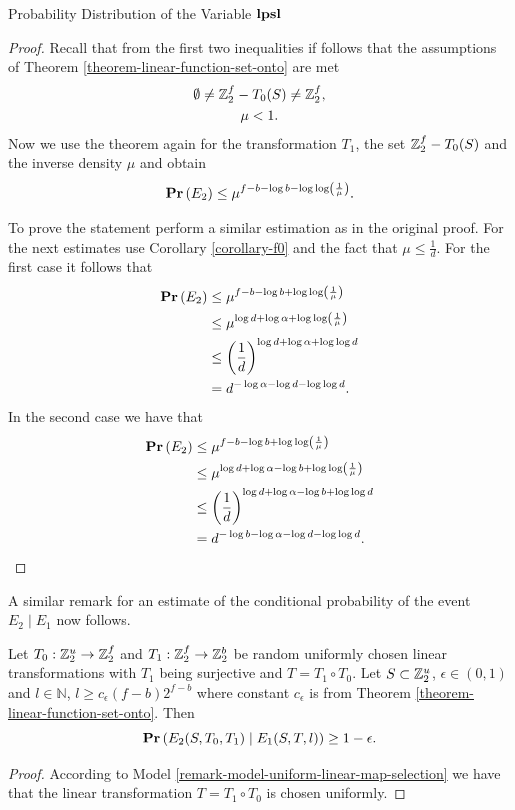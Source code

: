 \begin{section}{Probability Distribution of the Variable \texorpdfstring{$\mathbf{lpsl}$}{lpsl}}
\begin{proof}
Recall that from the first two inequalities if follows that the assumptions of Theorem \ref{theorem-linear-function-set-onto} are met
\begin{gather*}
\emptyset \neq \mathbb{Z}_{2}^{f} - T_0(S) \neq \mathbb{Z}_{2}^{f} \text{,} \\
\mu < 1 \text{.}
\end{gather*}
Now we use the theorem again for the transformation $T_1$, the set $\mathbb{Z}_{2}^{f} - T_0(S)$ and the inverse density $\mu$ and obtain
\[
	\mathbf{Pr}\left(E_2\right) \leq \mu ^ {f - b - \log b - \log \log \left( \frac{1}{\mu} \right)} \text{.}
\]

To prove the statement perform a similar estimation as in the original proof. For the next estimates use Corollary \ref{corollary-f0} and the fact that $\mu \leq \frac{1}{d}$. For the first case it follows that
\[
\begin{split}
\mathbf{Pr}\left(E_2\right) 
	& \leq \mu ^ {f - b - \log b + \log \log \left( \frac{1}{\mu} \right)} \\
	& \leq \mu ^ {\log d + \log \alpha + \log \log \left( \frac{1}{\mu} \right)} \\
	& \leq \left(\frac{1}{d}\right) ^ {\log d + \log \alpha + \log \log d} \\
	& = d ^ {-\log \alpha - \log d - \log \log d} \text{.}
\end{split}
\]
In the second case we have that 
\[
\begin{split}
\mathbf{Pr}\left(E_2\right) 
	& \leq \mu ^ {f - b - \log b + \log \log \left( \frac{1}{\mu} \right)} \\
	& \leq \mu ^ {\log d + \log \alpha - \log b  + \log \log \left( \frac{1}{\mu} \right)} \\
	& \leq \left(\frac{1}{d}\right) ^ {\log d + \log \alpha - \log b + \log \log d} \\
	& = d ^ {- \log b -\log \alpha - \log d - \log \log d} \text{.}
\end{split}
\]
\end{proof}

A similar remark for an estimate of the conditional probability of the event $E_2 \mid E_1$ now follows.
\begin{remark}
\label{remark-prob-l-length-chain}
Let $T_0: \mathbb{Z}_{2}^{u} \rightarrow \mathbb{Z}_{2}^{f}$ and $T_1: \mathbb{Z}_{2}^{f} \rightarrow \mathbb{Z}_{2}^{b}$ be random uniformly chosen linear transformations with $T_1$ being surjective and $T = T_1 \circ T_0$. Let $S \subset \mathbb{Z}_{2}^{u}$, $\epsilon \in (0, 1)$ and $l \in \mathbb{N}$, $l \geq c_{\epsilon}(f - b)2 ^ {f - b}$ where constant $c_\epsilon$ is from Theorem \ref{theorem-linear-function-set-onto}. Then
\[
	\mathbf{Pr}\left(E_2(S, T_0, T_1) \mid E_1(S, T, l)\right) \geq 1 - \epsilon \text{.}
\]
\end{remark}
\begin{proof}
According to Model \ref{remark-model-uniform-linear-map-selection} we have that the linear transformation $T = T_1 \circ T_0$ is chosen uniformly.


\end{proof}
\end{section}
